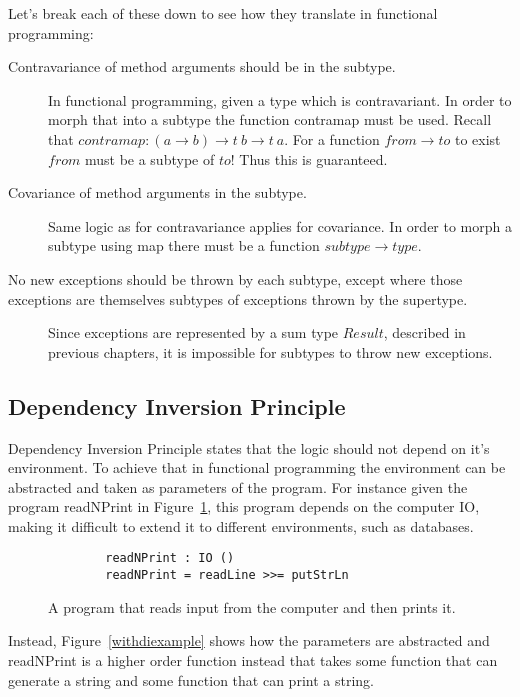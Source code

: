 Let's break each of these down to see how they translate in functional
programming:

\begin{description}
    \item [Contravariance of method arguments should be in the subtype.] In
        functional programming, given a type which is contravariant. In order to
        morph that into a subtype the function contramap must be used. Recall
        that $contramap : (a\rightarrow b)\rightarrow t\ b\rightarrow t\ a$. For
        a function $from\rightarrow to$ to exist $from$ must be a
        subtype of $to$! Thus this is guaranteed.
    \item [Covariance of method arguments in the subtype.] Same logic as for
        contravariance applies for covariance. In order to morph a subtype using
        map there must be a function $subtype\rightarrow type$.
    \item [No new exceptions should be thrown by each subtype, except where
        those exceptions are themselves subtypes of exceptions thrown by the
        supertype.] Since exceptions are represented by a sum type $Result$,
        described in previous chapters, it is impossible for subtypes to throw
        new exceptions.
\end{description}

\subsection{Dependency Inversion Principle} 

Dependency Inversion Principle states that the logic should not depend on it's
environment. To achieve that in functional programming the environment can
be abstracted and taken as parameters of the program. For instance given the
program readNPrint in Figure~\ref{diexample}, this program depends on the
computer IO, making it difficult to extend it to different environments, such as
databases. 

\begin{figure}[H]
    \begin{lstlisting}
        readNPrint : IO () 
        readNPrint = readLine >>= putStrLn
    \end{lstlisting}
    \caption{A program that reads input from the computer and then prints it.}
    \label{diexample}
\end{figure}

Instead, Figure~\ref{withdiexample} shows how the parameters are abstracted and
readNPrint is a higher order function instead that takes some function that
can generate a string and some function that can print a string.


